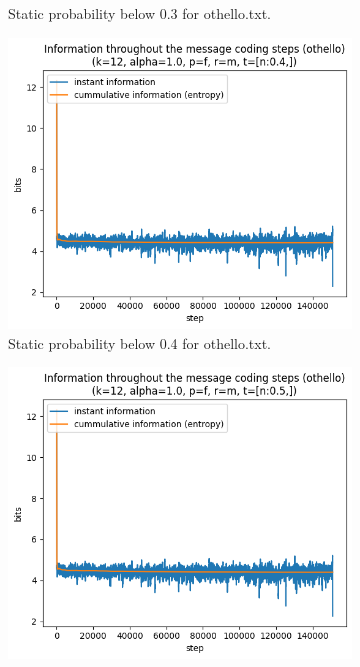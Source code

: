 \documentclass{article}
\begin{document}
\begin{figure}
\begin{subfigure}[b]{0.3\textwidth}
\begin{center}
        \end{center}
        \caption{Static probability below 0.3 for othello.txt.}
        \label{fig:othello-results-threshold-n-0.3}
    \end{subfigure}
    \hfill
    \begin{subfigure}[b]{0.3\textwidth}
        \begin{center}
            \includegraphics[width=1.0\linewidth]{../scripts/images/othello_12_1.0_f_m_[n:0.4,].png}
        \end{center}
        \caption{Static probability below 0.4 for othello.txt.}
        \label{fig:othello-results-threshold-n-0.4}
    \end{subfigure}
    \hfill
    \begin{subfigure}[b]{0.3\textwidth}
        \begin{center}
            \includegraphics[width=1.0\linewidth]{../scripts/images/othello_12_1.0_f_m_[n:0.5,].png}

\end{center}
\end{subfigure}
\end{figure}
\end{document}
